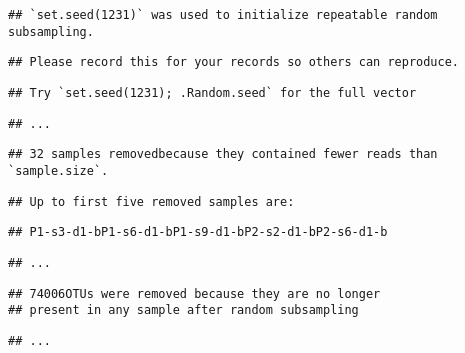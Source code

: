 \documentclass[
]{article}
\newenvironment{Shaded}{\begin{snugshade}}{\end{snugshade}}
\newcommand{\ControlFlowTok}[1]{\textcolor[rgb]{0.13,0.29,0.53}{\textbf{#1}}}
\newcommand{\DataTypeTok}[1]{\textcolor[rgb]{0.13,0.29,0.53}{#1}}
\newcommand{\DecValTok}[1]{\textcolor[rgb]{0.00,0.00,0.81}{#1}}
\newcommand{\KeywordTok}[1]{\textcolor[rgb]{0.13,0.29,0.53}{\textbf{#1}}}
\newcommand{\NormalTok}[1]{#1}
\newcommand{\OperatorTok}[1]{\textcolor[rgb]{0.81,0.36,0.00}{\textbf{#1}}}
\newcommand{\OtherTok}[1]{\textcolor[rgb]{0.56,0.35,0.01}{#1}}
\newcommand{\StringTok}[1]{\textcolor[rgb]{0.31,0.60,0.02}{#1}}
\begin{document}
\begin{verbatim}
## `set.seed(1231)` was used to initialize repeatable random subsampling.
\end{verbatim}

\begin{verbatim}
## Please record this for your records so others can reproduce.
\end{verbatim}

\begin{verbatim}
## Try `set.seed(1231); .Random.seed` for the full vector
\end{verbatim}

\begin{verbatim}
## ...
\end{verbatim}

\begin{verbatim}
## 32 samples removedbecause they contained fewer reads than `sample.size`.
\end{verbatim}

\begin{verbatim}
## Up to first five removed samples are:
\end{verbatim}

\begin{verbatim}
## P1-s3-d1-bP1-s6-d1-bP1-s9-d1-bP2-s2-d1-bP2-s6-d1-b
\end{verbatim}

\begin{verbatim}
## ...
\end{verbatim}

\begin{verbatim}
## 74006OTUs were removed because they are no longer 
## present in any sample after random subsampling
\end{verbatim}

\begin{verbatim}
## ...
\end{verbatim}

\begin{Shaded}
\end{Shaded}
\end{document}
